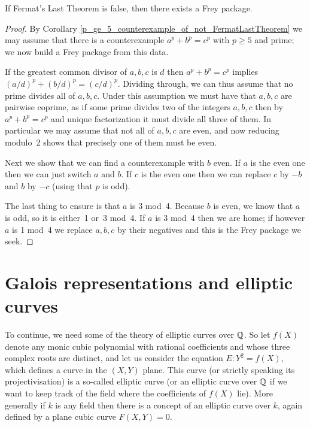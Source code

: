 \begin{lemma}\label{FLT.FreyPackage.of_not_FermatLastTheorem}\leanok{}
  If Fermat's Last Theorem is false, then there exists a Frey package.
\end{lemma}
\begin{proof} By Corollary \ref{p_ge_5_counterexample_of_not_FermatLastTheorem} we may assume that there is a counterexample $a^p+b^p=c^p$ with $p\geq 5$ and prime; we now build a Frey package from this data.
  
  If the greatest common divisor of $a,b,c$ is $d$ then $a^p+b^p=c^p$ implies $(a/d)^p+(b/d)^p=(c/d)^p$. Dividing through, we can thus assume that no prime divides all of $a,b,c$. Under this assumption we must have that $a,b,c$ are pairwise coprime, as if some prime divides two of the integers $a,b,c$ then by $a^p+b^p=c^p$ and unique factorization it must divide all three of them. In particular we may assume that not all of $a,b,c$ are even, and now reducing modulo~2 shows that precisely one of them must be even. 
  
  Next we show that we can find a counterexample with $b$ even. If $a$ is the even one then we can just switch $a$ and $b$. If $c$ is the even one then we can replace $c$ by $-b$ and $b$ by $-c$ (using that $p$ is odd).

  The last thing to ensure is that $a$ is 3 mod~4. Because $b$ is even, we know that $a$ is odd, so it is either~1 or~3 mod~4. If $a$ is 3 mod~4 then we are home; if however $a$ is 1 mod~4 we replace $a,b,c$ by their negatives and this is the Frey package we seek.
\end{proof}

\section{Galois representations and elliptic curves}\label{twopointfour}

To continue, we need some of the theory of elliptic curves over $\mathbb{Q}$. So let $f(X)$ denote any monic cubic polynomial with rational coefficients and whose three complex roots are distinct, and let us consider the equation $E:Y^2=f(X)$, which defines a curve in the $(X,Y)$ plane. This curve (or strictly speaking its projectivisation) is a so-called elliptic curve (or an elliptic curve over $\mathbb{Q}$ if we want to keep track of the field where the coefficients of $f(X)$ lie). More generally if $k$ is any field then there is a concept of an elliptic curve over $k$, again defined by a plane cubic curve $F(X,Y)=0$.

